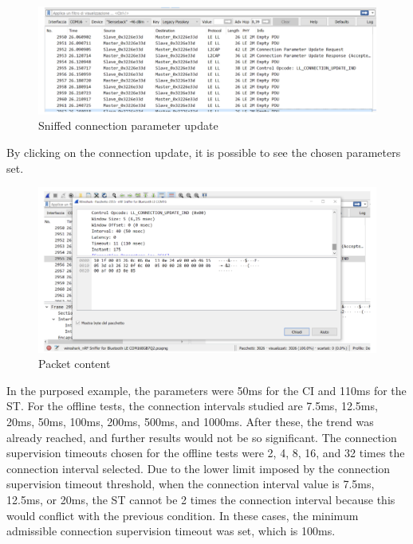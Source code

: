 \documentclass{Configuration_Files/PoliMi3i_thesis}
\begin{document}
\begin{figure}[H]
    \centering
    \includegraphics[scale=0.6]{Test_Procedure/2.png}
    \caption{Sniffed connection parameter update}
    \label{sniffed_connection_parameter_update}
\end{figure}

By clicking on the connection update, it is possible to see the chosen parameters set.

\begin{figure}[H]
    \centering
    \includegraphics[scale=0.6]{Test_Procedure/3.png}
    \caption{Packet content}
    \label{connection_parameters_wireshark}
\end{figure}

In the purposed example, the parameters were 50ms for the CI and 110ms for the ST. For the offline tests, the connection intervals studied are 7.5ms, 12.5ms, 20ms, 50ms, 100ms, 200ms, 500ms, and 1000ms. After these, the trend was already reached, and further results would not be so significant. The connection supervision timeouts chosen for the offline tests were 2, 4, 8, 16, and 32 times the connection interval selected. Due to the lower limit imposed by the connection supervision timeout threshold, when the connection interval value is 7.5ms, 12.5ms, or 20ms, the ST cannot be 2 times the connection interval because this would conflict with the previous condition. In these cases, the minimum admissible connection supervision timeout was set, which is 100ms.
\end{document}
